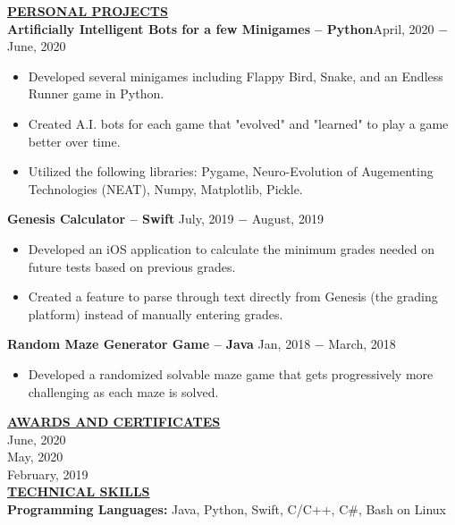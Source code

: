 \documentclass{article}
\begin{document}
\noindent \textbf{\underline{PERSONAL PROJECTS}} \\
\noindent \textbf{Artificially Intelligent Bots for a few Minigames -- Python}\hfill  April, 2020 $-$ June, 2020
\begin{itemize}[noitemsep,nolistsep,leftmargin=*]
\item {Developed several minigames including Flappy Bird, Snake, and an Endless Runner game in Python.}
\item {Created A.I. bots for each game that "evolved" and "learned" to play a game better over time.}
\item {Utilized the following libraries: Pygame, Neuro-Evolution of Augementing Technologies (NEAT), Numpy, Matplotlib, Pickle.}\\
\end{itemize}

\noindent \textbf{Genesis Calculator -- Swift} \hfill  July, 2019 $-$ August, 2019
\begin{itemize}[noitemsep,nolistsep,leftmargin=*]
\item {Developed an iOS application to calculate the minimum grades needed on future tests based on previous grades.}
\item {Created a feature to parse through text directly from Genesis (the grading platform) instead of manually entering grades.}\\
\end{itemize}

\noindent \textbf{Random Maze Generator Game -- Java} \hfill  Jan, 2018 $-$ March, 2018
\begin{itemize}[noitemsep,nolistsep,leftmargin=*]
\item {Developed a randomized solvable maze game that gets progressively more challenging as each maze is solved.}\\
\end{itemize}




\noindent \textbf{\underline{AWARDS AND CERTIFICATES}} \\
 \hfill June, 2020 \\
 \hfill May, 2020 \\
 \hfill February, 2019 \\



\noindent \textbf{\underline{TECHNICAL SKILLS}} \\
\noindent \textbf{Programming Languages:} Java, Python, Swift, C/C++, C\#, Bash on Linux\\
\end{document}
